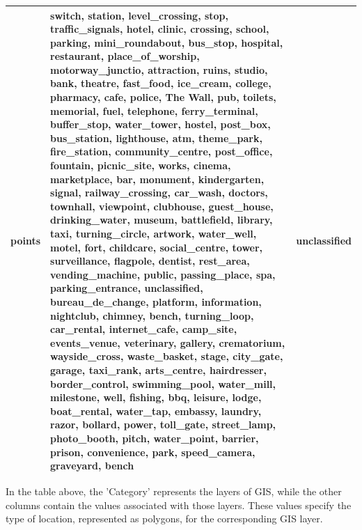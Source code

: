 \documentclass[a4paper,12pt]{Classes/RoboticsLaTeX}
\begin{document}
{\begin{longtable}{|p{2cm}|p{9cm}|p{2cm}|}
		\hline
		points & switch, station, level\_crossing, stop, traffic\_signals, hotel, clinic, crossing, school, parking, mini\_roundabout, bus\_stop, hospital, restaurant, place\_of\_worship, motorway\_junctio, attraction, ruins, studio, bank, theatre, fast\_food, ice\_cream, college, pharmacy, cafe, police, The Wall, pub, toilets, memorial, fuel, telephone, ferry\_terminal, buffer\_stop, water\_tower, hostel, post\_box, bus\_station, lighthouse, atm, theme\_park, fire\_station, community\_centre, post\_office, fountain, picnic\_site, works, cinema, marketplace, bar, monument, kindergarten, signal, railway\_crossing, car\_wash, doctors, townhall, viewpoint, clubhouse, guest\_house, drinking\_water, museum, battlefield, library, taxi, turning\_circle, artwork, water\_well, motel, fort, childcare, social\_centre, tower, surveillance, flagpole, dentist, rest\_area, vending\_machine, public, passing\_place, spa, parking\_entrance, unclassified, bureau\_de\_change, platform, information, nightclub, chimney, bench, turning\_loop, car\_rental, internet\_cafe, camp\_site, events\_venue, veterinary, gallery, crematorium, wayside\_cross, waste\_basket, stage, city\_gate, garage, taxi\_rank, arts\_centre, hairdresser, border\_control, swimming\_pool, water\_mill, milestone, well, fishing, bbq, leisure, lodge, boat\_rental, water\_tap, embassy, laundry, razor, bollard, power, toll\_gate, street\_lamp, photo\_booth, pitch, water\_point, barrier, prison, convenience, park, speed\_camera, graveyard, bench & unclassified \\
		\hline
		\end{longtable}}


		In the table above, the 'Category' represents the layers of \ac{GIS}, while the other columns contain the values associated with those layers. These values specify the type of location, represented as polygons, for the corresponding \ac{GIS} layer.
\end{document}
